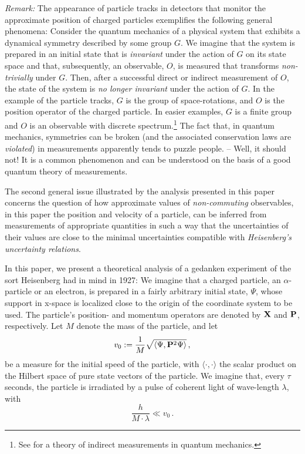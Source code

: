 \documentclass[12pt]{article}
\begin{document}
\textit{Remark:} The appearance of particle tracks in detectors that monitor the approximate position of charged particles
exemplifies the following general phenomena: Consider the quantum mechanics of a physical system that exhibits a
 dynamical symmetry described by some group $G$. We imagine that the system is prepared in an initial state that is
 \textit{invariant} under the action of $G$ on its state space and that, subsequently, an observable, $O$, is measured that
transforms \textit{non-trivially} under $G$. Then, after a successful direct or indirect measurement of $O$, the state of the
system is \textit{no longer invariant} under the action of $G$. In the example of the particle tracks, $G$ is the group of
space-rotations, and $O$ is the position operator of the charged particle. In easier examples, $G$ is a finite group and
$O$ is an observable with discrete spectrum.\footnote{See \cite{MK, BB, BBB, BFFS} for a theory of indirect measurements in quantum mechanics.} The fact that, in quantum mechanics, symmetries can be broken 
(and the associated conservation laws are \textit{violated}) in measurements apparently tends to
puzzle people. -- Well, it should not! It is a common phenomenon and can be understood on the basis of a 
good quantum theory of measurements. 

The second general issue illustrated by the analysis presented in this paper concerns
 the question of how approximate values of \textit{non-commuting} observables, in this paper the position and velocity 
 of a particle, can be inferred from measurements of appropriate quantities in such a way that the uncertainties of their 
 values are close to the minimal uncertainties compatible with \textit{Heisenberg's uncertainty relations}. 
 
In this paper, we present a theoretical analysis of a gedanken experiment of the sort Heisenberg  had in mind in 1927: 
We imagine that a charged particle, an $\alpha$-particle or an electron, is prepared in a fairly arbitrary initial state, $\Psi$, 
whose support in x-space is localized close to the origin of the coordinate system to be used. The particle's position- and 
momentum operators are denoted by ${\bf{X}}$ and ${\bf{P}}$, respectively. Let $M$ denote the mass of the particle, 
and let 
\begin{equation}\label{initial state}
v_0:= \frac{1}{M} \sqrt{\langle \Psi, {\bf{P}}^{2} \Psi \rangle}\,,
\end{equation}
be a measure for the initial speed of the particle, with $\langle \cdot ,\cdot \rangle$ the scalar product on the Hilbert space of pure state vectors of the particle. We imagine that, 
every $\tau$ seconds, the particle is irradiated by a pulse of coherent light of wave-length $\lambda$, with 
\begin{equation}\label{speed}
\frac{h}{M\cdot \lambda} \ll v_0\,.
\end{equation}
\end{document}

